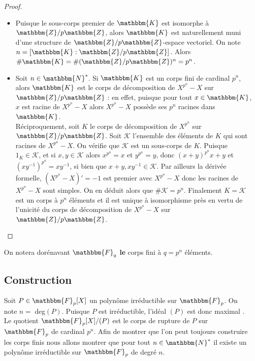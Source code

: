 \documentclass[12pt]{article}
\theoremstyle{remark}\newtheorem{note}{Note}
\theoremstyle{remark}\newtheorem{nota}{Notation}
\newcommand{\N}{\mathbbm{N}}
\newcommand{\Z}{\mathbbm{Z}}
\newcommand{\K}{\mathbbm{K}}
\newcommand{\F}{\mathbbm{F}}
\theoremstyle{definition}
\begin{document}
\begin{proof}\hspace{12pt}
\begin{itemize}
\item Puisque le sous-corps premier de $\K$ est isomorphe à $\Z / p \Z$, alors $\K$ est naturellement muni d'une structure de $\Z / p \Z$-espace vectoriel. On note $n = [ \K : \Z / p \Z ]$. Alors $\# \K = \# (\Z / p \Z)^n = p^n$.
\item Soit $n \in \N^{*}$. Si $\K$ est un corps fini de cardinal $p^n$, alors $\K$ est le corps de décomposition de $X^{p^n} - X$ sur $\Z / p \Z$ : en effet, puisque pour tout $x \in \K$, $x$ est racine de $X^{p^n} - X$ alors $X^{p^n} - X$ possède ses $p^n$ racines dans $\K$.\\
Réciproquement, soit $K$ le corps de décomposition de $X^{p^n}$ sur $\Z / p \Z$. Soit $\mathcal{K}$ l'ensemble des éléments de $K$ qui sont racines de $X^{p^n} - X$. On vérifie que $\mathcal{K}$ est un sous-corps de $K$. Puisque $1_K \in \mathcal{K}$, et si $x,y \in \mathcal{K}$ alors $x^{p^n}= x$ et $y^{p^n} = y$, donc $(x+y)^{p^n} x + y$ et $(xy^{-1})^{p^n} = xy^{-1}$, si bien que $x + y, xy^{-1} \in \mathcal{K}$. Par ailleurs la dérivée formelle, $(X^{p^n} - X)' = -1$ est premier avec $X^{p^n} - X$ donc les racines de $X^{p^n} - X$ sont simples. On en déduit alors que $\# \mathcal{K} = p^n$. Finalement $K = \mathcal{K}$ est un corps à $p^n$ éléments et il est unique à isomorphisme près en vertu de l'unicité du corps de décomposition de $X^{p^n} - X$ sur $\Z / p \Z$.
\end{itemize}
\end{proof}
On notera dorénavant $\F_q$ \textbf{le} corps fini à $q = p^n$ éléments.
\subsection{Construction}
Soit $P \in \F_p [X]$ un polynôme irréductible sur $\F_p$. On note $n = $ deg$(P)$. Puisque $P$ est irréductible, l'idéal $(P)$ est donc maximal%
. Le quotient $\F_p [X] / (P)$ est le corps de rupture de $P$ sur $\F_p$ de cardinal $p^n$. Afin de montrer que l'on peut toujours construire les corps finis nous allons montrer que pour tout $n \in \N^{*}$ il existe un polynôme irréductible sur $\F_p$ de degré $n$.
\end{document}
